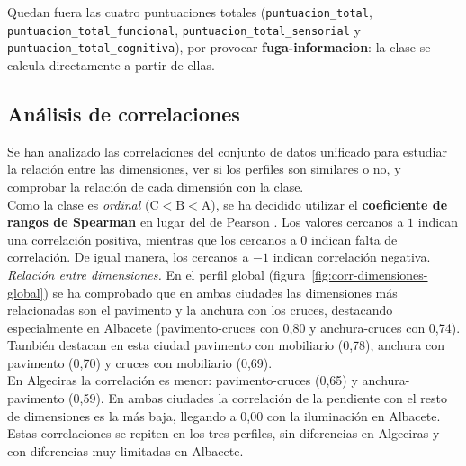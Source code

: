 Quedan fuera las cuatro puntuaciones totales (\texttt{puntuacion\_\allowbreak total}, \texttt{puntuacion\_\allowbreak total\_\allowbreak funcional}, \texttt{puntuacion\_\allowbreak total\_\allowbreak sensorial} y \texttt{puntuacion\_\allowbreak total\_\allowbreak cognitiva}), por provocar \textbf{\gls{fuga-informacion}}: la clase se calcula directamente a partir de ellas.
\\


\subsection{Análisis de correlaciones}
\label{subsec:dis-correlaciones}

Se han analizado las correlaciones del conjunto de datos unificado para estudiar la relación entre las dimensiones, ver si los perfiles son similares o no, y comprobar la relación de cada dimensión con la clase.
\\

Como la clase es \textit{ordinal} ($\mathrm{C} < \mathrm{B} < \mathrm{A}$), se ha decidido utilizar el \textbf{coeficiente de rangos de Spearman} en lugar del de Pearson \parencite{minitab_pearson_spearman}. Los valores cercanos a $1$ indican una correlación positiva, mientras que los cercanos a $0$ indican falta de correlación. De igual manera, los cercanos a $-1$ indican correlación negativa.
\\

\textit{Relación entre dimensiones.} En el perfil global (figura~\ref{fig:corr-dimensiones-global}) se ha comprobado que en ambas ciudades las dimensiones más relacionadas son el pavimento y la anchura con los cruces, destacando especialmente en Albacete (pavimento-cruces con 0,80 y anchura-cruces con 0,74). También destacan en esta ciudad pavimento con mobiliario (0,78), anchura con pavimento (0,70) y cruces con mobiliario (0,69).
\\

En Algeciras la correlación es menor: pavimento-cruces (0,65) y anchura-pavimento (0,59). En ambas ciudades la correlación de la pendiente con el resto de dimensiones es la más baja, llegando a 0,00 con la iluminación en Albacete. Estas correlaciones se repiten en los tres perfiles, sin diferencias en Algeciras y con diferencias muy limitadas en Albacete.
\\

